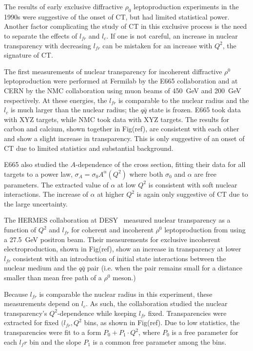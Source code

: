 The results of early exclusive diffractive $\rho_0$ leptoproduction
experiments in the 1990s were suggestive of the onset of CT, but had limited
statistical power.
Another factor complicating the study of CT in this exclusive process is the
need to separate the effects of $l_{fr}$ and $l_c$.
If one is not careful, an increase in nuclear transparency with decreasing
$l_{fr}$ can be mistaken for an increase with $Q^2$, the signature of CT.


The first measurements of nuclear transparency for incoherent diffractive
$\rho^0$ leptoproduction were performed
at Fermilab by the E665 collaboration \cite{Adams_1995} and
at CERN by the NMC collaboration \cite{Arneodo_1994}
using muon beams of \SI{450}{\giga\electronvolt} and
\SI{200}{\giga\electronvolt} respectively.
At these energies, the $l_{fr}$ is comparable to the nuclear radius and
the $l_c$ is much larger than the nuclear radius; the $q\bar{q}$
state is frozen.
E665 took data with XYZ targets, while NMC took data with XYZ targets.
The results for carbon and calcium, shown together in Fig(ref), are consistent
with each other and show a slight increase in transparency.
This is only suggestive of an onset of CT due to limited statistics and
substantial background.


E665 also studied the $A$-dependence of the cross section, fitting their data
for all targets to a power law, $\sigma_A=\sigma_0A^\alpha(Q^2)$ where both
$\sigma_0$ and $\alpha$ are free parameters.
The extracted value of $\alpha$ at low $Q^2$ is consistent with soft nuclear
interactions.
The increase of $\alpha$ at higher $Q^2$ is again only suggestive of CT due to
the large uncertainty.


The HERMES collaboration at DESY~\cite{Ackerstaff_1999} measured nuclear
transparency as a function of $Q^2$ and $l_{fr}$ for coherent and incoherent
$\rho^0$ leptoproduction from  using a \SI{27.5}{\giga\electronvolt}
positron beam.
Their measurements for exclusive incoherent electroproduction, shown in
Fig(ref), show an increase in transparency at lower $l_{fr}$ consistent with an
introduction of initial state interactions between the nuclear medium and the
$q\bar{q}$ pair (i.e. when the pair remains small for a distance smaller than
mean free path of a $\rho^0$ meson.)


Because $l_{fr}$ is comparable the nuclear radius in this experiment, these
measurements depend on $l_c$.
As such, the collaboration studied the nuclear transparency's $Q^2$-dependence
while keeping $l_{fr}$ fixed.
Transparencies were extracted for fixed $(l_{fr},Q^2$ bins, as shown in
Fig(ref).
Due to low statistics, the transparencies were fit to a form
$P_0 + P_1 \cdot Q^2$, where $P_0$ is a free parameter for each $l_fr$ bin and
the slope $P_1$ is a common free parameter among the bins.


